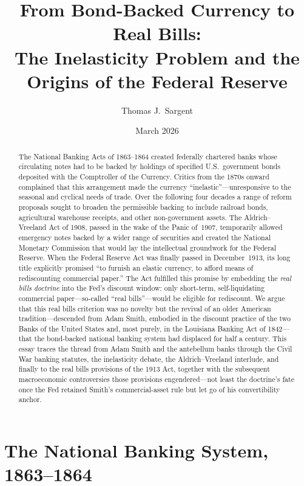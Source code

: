 \documentclass[12pt]{article}
\title{\textbf{From Bond-Backed Currency to Real Bills:\\
The Inelasticity Problem and the Origins of the Federal Reserve}}
\author{Thomas J.\ Sargent}
\date{March 2026}
\begin{document}
\maketitle

\begin{abstract}
\noindent
The National Banking Acts of 1863--1864 created federally chartered banks whose
circulating notes had to be backed by holdings of specified U.S.\ government bonds
deposited with the Comptroller of the Currency.  Critics from the 1870s onward
complained that this arrangement made the currency ``inelastic''---unresponsive to
the seasonal and cyclical needs of trade.  Over the following four decades a range
of reform proposals sought to broaden the permissible backing to include railroad
bonds, agricultural warehouse receipts, and other non-government assets.  The
Aldrich--Vreeland Act of 1908, passed in the wake of the Panic of~1907, temporarily
allowed emergency notes backed by a wider range of securities and created the
National Monetary Commission that would lay the intellectual groundwork for the
Federal Reserve.  When the Federal Reserve Act was finally passed in December~1913,
its long title explicitly promised ``to furnish an elastic currency, to afford means
of rediscounting commercial paper.''  The Act fulfilled this promise by embedding
the \emph{real bills doctrine} into the Fed's discount window: only short-term,
self-liquidating commercial paper---so-called ``real bills''---would be eligible
for rediscount.  We argue that this real bills criterion was no novelty but the
revival of an older American tradition---descended from Adam Smith, embodied in the
discount practice of the two Banks of the United States and, most purely, in the
Louisiana Banking Act of 1842---that the bond-backed national banking system had
displaced for half a century.  This essay traces the thread from Adam Smith and the
antebellum banks through the Civil War banking statutes, the inelasticity debate,
the Aldrich--Vreeland interlude, and finally to the real bills provisions of the
1913 Act, together with the subsequent macroeconomic controversies those provisions
engendered---not least the doctrine's fate once the Fed retained Smith's
commercial-asset rule but let go of his convertibility anchor.
\end{abstract}

\tableofcontents
\newpage

\section{The National Banking System, 1863--1864}
\label{sec:national-banking}
\end{document}

